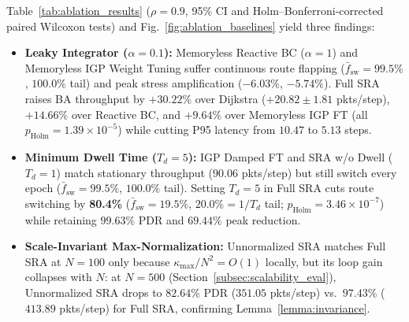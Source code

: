 \documentclass[journal]{IEEEtran}
\theoremstyle{plain}
\theoremstyle{definition}
\begin{document}
{Table~\ref{tab:ablation_results} ($\rho = 0.9$, 95\% CI and Holm--Bonferroni-corrected paired Wilcoxon tests) and Fig.~\ref{fig:ablation_baselines} yield three findings:
\begin{itemize}
    \item \textbf{Leaky Integrator ($\alpha=0.1$):} Memoryless Reactive BC ($\alpha=1$) and Memoryless IGP Weight Tuning suffer continuous route flapping ($\bar{f}_{\text{sw}} = 99.5\%$, $100.0\%$ tail) and peak stress amplification ($-6.03\%$, $-5.74\%$). Full SRA raises BA throughput by $+30.22\%$ over Dijkstra ($+20.82 \pm 1.81$ pkts/step), $+14.66\%$ over Reactive BC, and $+9.64\%$ over Memoryless IGP FT (all $p_{\text{Holm}} = 1.39 \times 10^{-5}$) while cutting P95 latency from $10.47$ to $5.13$ steps.
    \item \textbf{Minimum Dwell Time ($T_d=5$):} IGP Damped FT and SRA w/o Dwell ($T_d=1$) match stationary throughput ($90.06$ pkts/step) but still switch every epoch ($\bar{f}_{\text{sw}} = 99.5\%$, $100.0\%$ tail). Setting $T_d=5$ in Full SRA cuts route switching by \textbf{80.4\%} ($\bar{f}_{\text{sw}} = 19.5\%$, $20.0\% = 1/T_d$ tail; $p_{\text{Holm}} = 3.46 \times 10^{-7}$) while retaining $99.63\%$ PDR and $69.44\%$ peak reduction.
    \item \textbf{Scale-Invariant Max-Normalization:} Unnormalized SRA matches Full SRA at $N=100$ only because $\kappa_{\max}/N^2 = O(1)$ locally, but its loop gain collapses with $N$: at $N=500$ (Section~\ref{subsec:scalability_eval}), Unnormalized SRA drops to \textbf{$82.64\%$} PDR ($351.05$ pkts/step) vs.\ \textbf{$97.43\%$} ($413.89$ pkts/step) for Full SRA, confirming Lemma~\ref{lemma:invariance}.
\end{itemize}}
\end{document}
